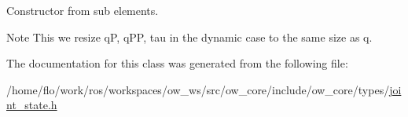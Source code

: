 Constructor from sub elements. 

\begin{DoxyNote}{Note}
This we resize qP, q\+PP, tau in the dynamic case to the same size as q. 
\end{DoxyNote}


The documentation for this class was generated from the following file\+:\begin{DoxyCompactItemize}
\item 
/home/flo/work/ros/workspaces/ow\+\_\+ws/src/ow\+\_\+core/include/ow\+\_\+core/types/\hyperlink{joint__state_8h}{joint\+\_\+state.\+h}\end{DoxyCompactItemize}
